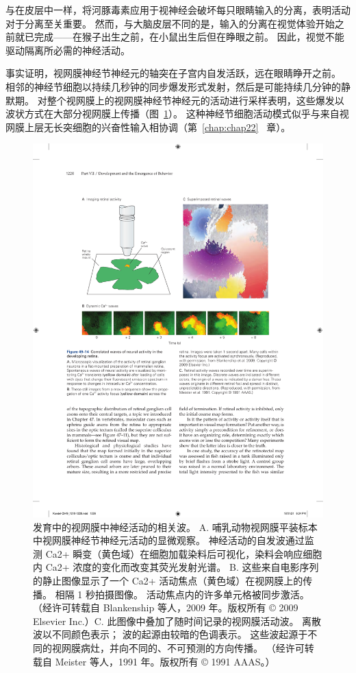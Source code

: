 与在皮层中一样，将河豚毒素应用于视神经会破坏每只眼睛输入的分离，表明活动对于分离至关重要。
然而，与大脑皮层不同的是，输入的分离在视觉体验开始之前就已完成——在猴子出生之前，在小鼠出生后但在睁眼之前。
因此，视觉不能驱动隔离所必需的神经活动。


事实证明，视网膜神经节神经元的轴突在子宫内自发活跃，远在眼睛睁开之前。
相邻的神经节细胞以持续几秒钟的同步爆发形式发射，然后是可能持续几分钟的静默期。
对整个视网膜上的视网膜神经节神经元的活动进行采样表明，这些爆发以波状方式在大部分视网膜上传播（图~\ref{fig:49_14}）。
这种神经节细胞活动模式似乎与来自视网膜上层无长突细胞的兴奋性输入相协调（第~\ref{chap:chap22}~ 章）。


\begin{figure}[htbp]
	\centering
	\includegraphics[width=0.8\linewidth]{chap49/fig_49_14}
	\caption{发育中的视网膜中神经活动的相关波。 A. 哺乳动物视网膜平装标本中视网膜神经节神经元活动的显微观察。 神经活动的自发波通过监测 Ca2+ 瞬变（黄色域）在细胞加载染料后可视化，染料会响应细胞内 Ca2+ 浓度的变化而改变其荧光发射光谱。 B. 这些来自电影序列的静止图像显示了一个 Ca2+ 活动焦点（黄色域）在视网膜上的传播。 相隔 1 秒拍摄图像。 活动焦点内的许多单元格被同步激活。 （经许可转载自 Blankenship 等人，2009 年。版权所有 © 2009 Elsevier Inc.）C. 此图像中叠加了随时间记录的视网膜活动波。 离散波以不同颜色表示； 波的起源由较暗的色调表示。 这些波起源于不同的视网膜病灶，并向不同的、不可预测的方向传播。 （经许可转载自 Meister 等人，1991 年。版权所有 © 1991 AAAS。）}
	\label{fig:49_14}
\end{figure}


